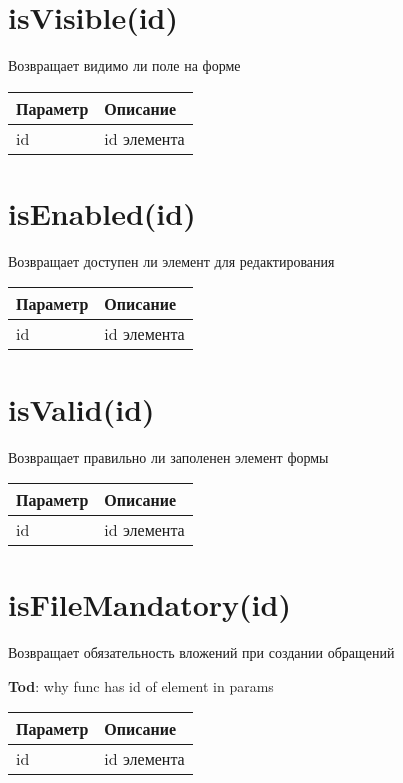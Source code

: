 \hypertarget{isvisibleid-boolean}{%
\section{isVisible(id)}\label{isvisibleid-boolean}}

Возвращает видимо ли поле на форме


\begin{longtable}[]{@{}ll@{}}
\toprule
Параметр & Описание\tabularnewline
\midrule
\endhead
id & id элемента\tabularnewline
\bottomrule
\end{longtable}

\hypertarget{isenabledid-boolean}{%
\section{isEnabled(id)}\label{isenabledid-boolean}}

Возвращает доступен ли элемент для редактирования


\begin{longtable}[]{@{}ll@{}}
\toprule
Параметр & Описание\tabularnewline
\midrule
\endhead
id & id элемента\tabularnewline
\bottomrule
\end{longtable}

\hypertarget{isvalidid-boolean}{%
\section{isValid(id)}\label{isvalidid-boolean}}

Возвращает правильно ли заполенен элемент формы


\begin{longtable}[]{@{}ll@{}}
\toprule
Параметр & Описание\tabularnewline
\midrule
\endhead
id & id элемента\tabularnewline
\bottomrule
\end{longtable}

\hypertarget{isfilemandatoryid-boolean}{%
\section{isFileMandatory(id)}\label{isfilemandatoryid-boolean}}

Возвращает обязательность вложений при создании обращений

\textbf{Tod}: why func has id of element in params

\begin{longtable}[]{@{}ll@{}}
\toprule
Параметр & Описание\tabularnewline
\midrule
\endhead
id & id элемента\tabularnewline
\bottomrule
\end{longtable}

